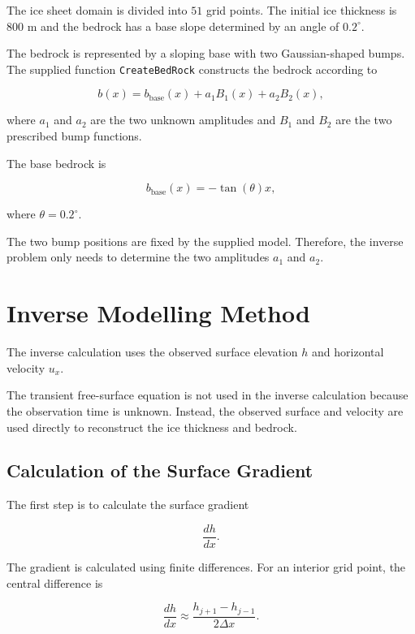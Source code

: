 \documentclass{article}
\begin{document}
The ice sheet domain is divided into $51$ grid points. The initial ice
thickness is $800$ m and the bedrock has a base slope determined by an
angle of $0.2^\circ$.

The bedrock is represented by a sloping base with two Gaussian-shaped
bumps. The supplied function \texttt{CreateBedRock} constructs the
bedrock according to

\begin{equation}
b(x) = b_{\mathrm{base}}(x)
       +a_1B_1(x)
       +a_2B_2(x),
\end{equation}

where $a_1$ and $a_2$ are the two unknown amplitudes and $B_1$ and
$B_2$ are the two prescribed bump functions.

The base bedrock is

\begin{equation}
b_{\mathrm{base}}(x)=-\tan(\theta)x,
\end{equation}

where $\theta=0.2^\circ$.

The two bump positions are fixed by the supplied model. Therefore, the
inverse problem only needs to determine the two amplitudes $a_1$ and
$a_2$.


\section{Inverse Modelling Method}

The inverse calculation uses the observed surface elevation $h$ and
horizontal velocity $u_x$.

The transient free-surface equation is not used in the inverse
calculation because the observation time is unknown. Instead, the
observed surface and velocity are used directly to reconstruct the
ice thickness and bedrock.

\subsection{Calculation of the Surface Gradient}

The first step is to calculate the surface gradient

\begin{equation}
\frac{dh}{dx}.
\end{equation}

The gradient is calculated using finite differences. For an interior
grid point, the central difference is

\begin{equation}
\frac{dh}{dx}
\approx
\frac{h_{j+1}-h_{j-1}}{2\Delta x}.
\end{equation}
\end{document}
